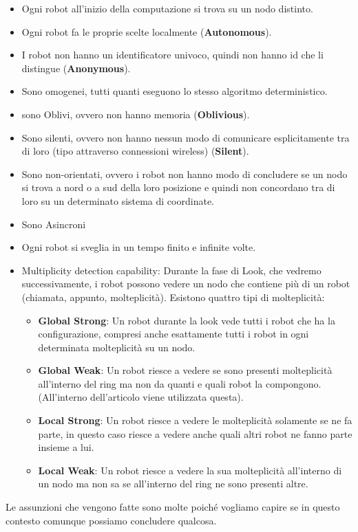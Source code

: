 \begin{itemize}
    \item Ogni robot all'inizio della computazione si trova su un nodo distinto.
    \item Ogni robot fa le proprie scelte localmente (\textbf{Autonomous}).
    \item I robot non hanno un identificatore univoco, quindi non hanno id che li
          distingue (\textbf{Anonymous}).
    \item Sono omogenei, tutti quanti eseguono lo stesso algoritmo deterministico.
    \item sono Oblivi, ovvero non hanno memoria (\textbf{Oblivious}).
    \item Sono silenti, ovvero non hanno nessun modo di comunicare esplicitamente
          tra di loro (tipo attraverso connessioni wireless) (\textbf{Silent}).
    \item Sono non-orientati, ovvero i robot non hanno modo di concludere se un
          nodo si trova a nord o a sud della loro posizione e quindi non concordano tra
          di loro su un determinato sistema di coordinate.
    \item Sono Asincroni
    \item Ogni robot si sveglia in un tempo finito e infinite volte.
    \item Multiplicity detection capability: Durante la fase di Look, che vedremo
          successivamente, i robot possono vedere un nodo che contiene più di un robot
          (chiamata, appunto, molteplicità). Esistono quattro tipi di molteplicità:
          \begin{itemize}
              \item \textbf{Global Strong}: Un robot durante la look vede tutti i
                    robot che ha la configurazione, compresi anche esattamente tutti i
                    robot in ogni determinata molteplicità su un nodo.
              \item \textbf{Global Weak}: Un robot riesce a vedere se sono presenti
                    molteplicità all'interno del ring ma non da quanti e quali robot la
                    compongono. (All'interno dell'articolo viene utilizzata questa).
              \item \textbf{Local Strong}: Un robot riesce a vedere le molteplicità
                    solamente se ne fa parte, in questo caso riesce a vedere anche quali
                    altri robot ne fanno parte insieme a lui.
              \item \textbf{Local Weak}: Un robot riesce a vedere la sua
                    molteplicità all'interno di un nodo ma non sa se all'interno del ring
                    ne sono presenti altre.
          \end{itemize}
\end{itemize}
Le assunzioni che vengono fatte sono molte poiché vogliamo capire se in questo
contesto comunque possiamo concludere qualcosa.\\

